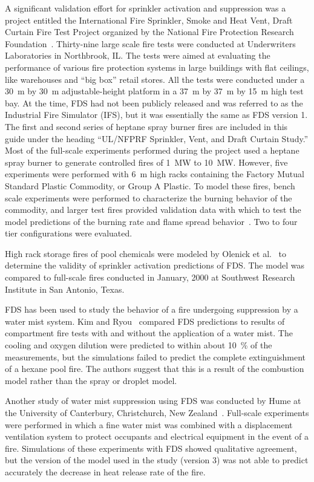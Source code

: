 A  significant validation effort  for sprinkler  activation and suppression was a project entitled the International Fire Sprinkler, Smoke and Heat Vent, Draft Curtain Fire Test Project organized by the National Fire Protection  Research Foundation~\cite{McGrattan:5}. Thirty-nine large scale fire tests were conducted at Underwriters Laboratories in Northbrook, IL. The tests were aimed at evaluating the performance of various fire protection systems in large buildings with flat ceilings, like warehouses and ``big box'' retail stores. All the tests were conducted under a 30~m by 30~m adjustable-height platform in a 37~m by 37~m by 15~m high test bay. At the time, FDS had not been publicly released and was referred to as the Industrial Fire Simulator (IFS), but it was essentially the same as FDS version 1. The first and second series of heptane spray burner fires are included in this guide under the heading ``UL/NFPRF Sprinkler, Vent, and Draft Curtain Study.'' Most of the full-scale experiments performed during the project used a heptane spray burner to  generate controlled fires of 1~MW to 10~MW. However, five experiments were performed with 6~m high racks containing the Factory Mutual Standard Plastic Commodity, or Group A Plastic. To model these fires, bench scale experiments were performed to characterize the burning behavior of the commodity, and larger test fires provided validation data with which to test the model predictions of the burning rate and flame spread behavior~\cite{Hamins:1,Hamins:IAFSS2002}. Two to four tier configurations were evaluated.

High rack storage fires of pool chemicals were modeled by Olenick et al.~\cite{Olenick:1} to determine the validity of sprinkler activation predictions of FDS. The model was compared to full-scale fires conducted in January, 2000 at Southwest Research Institute in San Antonio, Texas.

FDS has been used to study the behavior of a fire undergoing suppression by a water mist system. Kim and Ryou~\cite{Kim:BE2003,Kim:IJACR2004}  compared FDS  predictions to results of compartment fire tests with and without the application of a water mist. The cooling and oxygen dilution were predicted to within about 10~\% of the measurements, but the simulations failed to predict the complete extinguishment of a hexane pool fire. The authors suggest that this is a result of the combustion model rather than the spray or droplet model.

Another study of water mist suppression using FDS was conducted by Hume  at  the  University  of  Canterbury,  Christchurch,  New Zealand~\cite{Hume:Masters}. Full-scale experiments were performed in which a fine water mist was combined with a displacement ventilation system to protect occupants and electrical equipment in the event of a fire. Simulations of these experiments with FDS showed qualitative agreement, but the version of the model used in the study (version 3) was not able to predict accurately the decrease in heat release rate of the fire.

